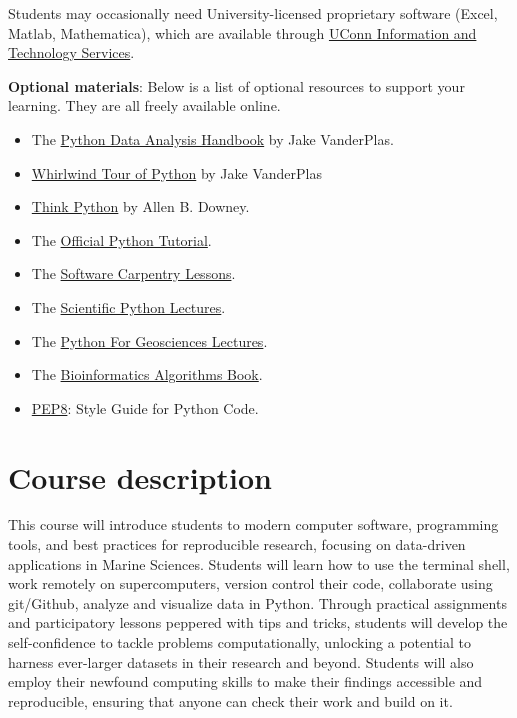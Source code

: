 \documentclass[11pt]{article}
\begin{document}
Students may occasionally need University-licensed proprietary software (Excel, Matlab, Mathematica), which are available through \href{https://software.uconn.edu/software}{UConn Information and Technology Services}.

\textbf{Optional materials}: Below is a list of optional resources to support your learning. They are all freely available online.

	\begin{itemize}
		\item The \href{https://jakevdp.github.io/PythonDataScienceHandbook/}{Python Data Analysis Handbook} by Jake VanderPlas.	
		\item \href{https://github.com/jakevdp/WhirlwindTourOfPython}{Whirlwind Tour of Python} by Jake VanderPlas
		\item \href{http://greenteapress.com/wp/think-python-2e/}{Think Python} by Allen B. Downey.
		\item The \href{https://docs.python.org/3/tutorial/}{Official Python Tutorial}.
		\item The \href{https://software-carpentry.org/lessons/}{Software Carpentry Lessons}.
		\item The   \href{http://scipy-lectures.org}{Scientific Python Lectures}. 
		\item The \href{https://github.com/koldunovn/python_for_geosciences}{Python For Geosciences Lectures}.
		\item The \href{https://www.bioinformaticsalgorithms.org}{Bioinformatics Algorithms Book}.
		\item \href{https://www.python.org/dev/peps/pep-0008/}{PEP8}: Style Guide for Python Code.

	\end{itemize}



\section*{Course description}

This course will introduce students to modern computer software, programming
tools, and best practices for reproducible research, focusing on data-driven
applications in Marine Sciences. Students will learn how to use the terminal
shell, work remotely on supercomputers, version control their code, collaborate
using git/Github, analyze and visualize data in Python. Through practical
assignments and participatory lessons peppered with tips and tricks, students
will develop the self-confidence to tackle problems computationally, unlocking
a potential to harness ever-larger datasets in their research and beyond.
Students will also employ their newfound computing skills to make their findings
accessible and reproducible, ensuring that anyone can check their work and build on it. 
\end{document}
